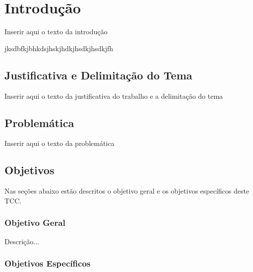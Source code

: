 \chapter{Introdução}

Inserir aqui o texto da introdução

jksdbfkjbhkdsjhskjhdkjhsdkjhsdkjfh

\section{Justificativa e Delimitação do Tema}

Inserir aqui o texto da justificativa do trabalho e a delimitação do tema

\section{Problemática}

Inserir aqui o texto da problemática

\section{Objetivos}

Nas seções abaixo estão descritos o objetivo geral e os objetivos específicos deste TCC.

\subsection{Objetivo Geral}

Descrição...

\subsection{Objetivos Específicos}

